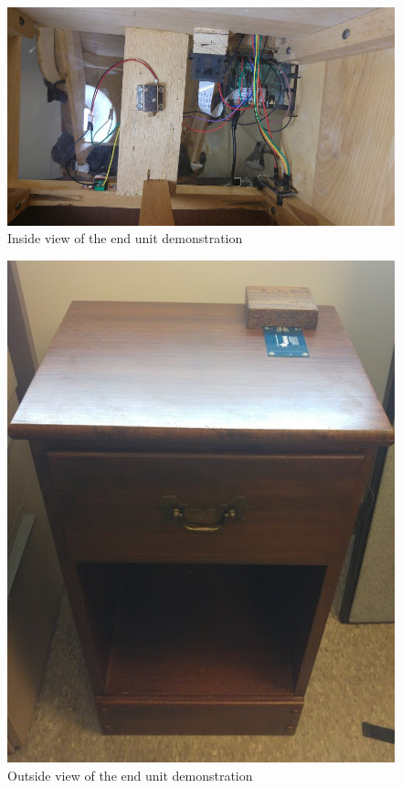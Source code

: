 \documentclass[12pt]{report}
\begin{document}
\begin{figure}
    \includegraphics[width=\textwidth]{Diagrams/end_unit_inside}
    \caption[End unit inside view]{Inside view of the end unit demonstration}
    \label{fig:end-unit-inside}
\end{figure}

\begin{figure}
    \includegraphics[width=\textwidth]{Diagrams/end_unit_outside}
    \caption[End unit outside view]{Outside view of the end unit demonstration}
    \label{fig:end-unit-outside}
\end{figure}
\end{document}
